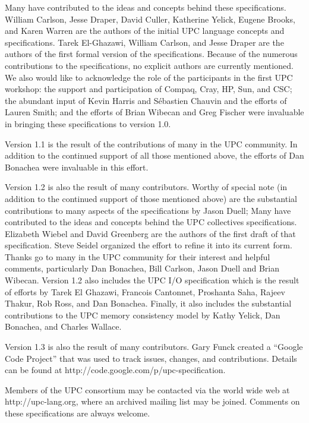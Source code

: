                                              
\npf Many have contributed to the ideas and concepts behind
    these specifications.  William Carlson, Jesse Draper,  David Culler, 
Katherine Yelick,
Eugene Brooks, and Karen Warren are the authors of the initial
UPC language concepts and specifications. Tarek El-Ghazawi, 
William Carlson, and Jesse Draper are the authors of the first formal
version of the specifications.  Because of the numerous contributions
to the specifications, no explicit authors are currently mentioned.
We also would like to
acknowledge the role of the participants in the first UPC workshop:
the support and participation of Compaq, Cray, HP, Sun,
and CSC; the abundant input of
Kevin Harris and S\'{e}bastien Chauvin and the efforts of Lauren
Smith; and the efforts of Brian Wibecan and Greg Fischer were
invaluable in bringing these specifications to version 1.0.

\np Version 1.1 is the result of the contributions of many in the UPC
community.  In addition to the
continued support of all those mentioned above, the efforts of Dan
Bonachea were invaluable in this effort.

\np Version 1.2 is also the result of many contributors.  Worthy of special
note (in addition to the
continued support of those mentioned above) are the substantial 
contributions to many aspects of the specifications by Jason Duell;
Many have contributed to the ideas and concepts behind the
UPC collectives specifications.
Elizabeth Wiebel and David Greenberg are the authors of the first draft of
that specification.  Steve Seidel organized the effort to
refine it into its current form.
Thanks go to many in the UPC community for their interest and helpful
comments, particularly Dan Bonachea, Bill Carlson, Jason Duell and
Brian Wibecan.
Version 1.2 also includes the UPC I/O specification which is the result of
efforts by Tarek El Ghazawi, Francois Cantonnet, Proshanta Saha, Rajeev Thakur,
Rob Ross, and Dan Bonachea.
Finally, it also includes the substantial contributions to the UPC memory consistency
model by Kathy Yelick, Dan Bonachea, and Charles Wallace.

\np Version 1.3 is also the result of many contributors. Gary Funck created a
``Google Code Project'' that was used to track issues, changes, and contributions.
Details can be found at http://code.google.com/p/upc-specification.

\np Members of the UPC consortium may be contacted via the world wide
web at
http://upc-lang.org, where an archived mailing list
may be joined.  Comments on these specifications are always welcome.
